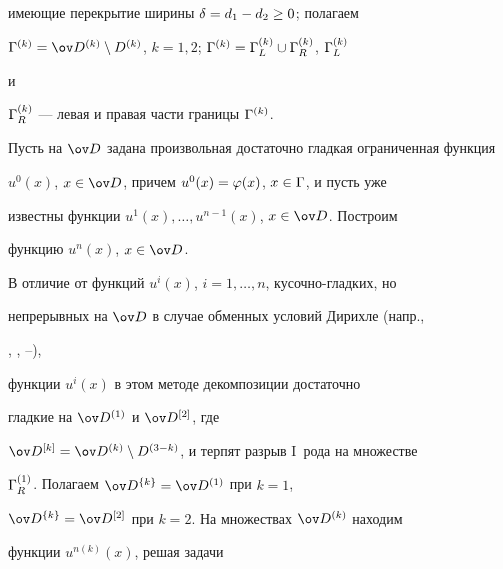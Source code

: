 имеющие перекрытие ширины $\delta = d_1 - d_2 \geq 0$; полагаем


$\G^{(k)}=\od^{(k)} \setminus D^{(k)}$, $k=1,2$; $\G^{(k)}=


\G^{(k)}_L \cup \G^{(k)}_R$, $\G^{(k)}_L$


и


$\Gamma^{(k)}_R$ --- левая и правая части границы $\Gamma^{(k)}$.





Пусть на $\od$ задана произвольная достаточно гладкая ограниченная функция


$u^0(x)$, $x \in \od$, причем $u^0(x)=\varphi(x)$, $x \in \Gamma$, и пусть уже


известны функции $u^1(x), \dotsc, u^{n-1}(x)$, $x \in \od$. Построим


функцию $u^n(x)$, $x \in \od$.





В отличие от функций $u^i(x)$, $i=1,\dotsc, n$, кусочно-гладких, но


непрерывных на $\od$ в случае обменных условий Дирихле (напр.,


\cite{6}, \cite{7}, \cite{17}--\cite{20}),


функции $u^i(x)$ в этом методе декомпозиции достаточно


гладкие на $\od^{(1)}$ и $\od^{[2]}$, где


$\od^{[k]}=\od^{(k)}\setminus D^{(3-k)}$, и терпят разрыв I~рода на множестве


$\Gamma^{(1)}_R$. Полагаем $\od^{\{k\}}=\od^{(1)}$ при $k=1$,


$\od^{\{k\}}=\od^{[2]}$ при $k=2$. На множествах $\od^{(k)}$ находим


функции $u^{n(k)}(x)$, решая задачи


